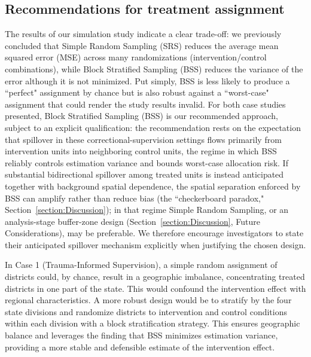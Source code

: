 \documentclass{article}[11pt]
\begin{document}
\subsection{Recommendations for treatment assignment}
The results of our simulation study indicate a clear trade-off: we previously concluded that Simple Random Sampling (SRS) reduces the average mean squared error (MSE) across many randomizations (intervention/control combinations), while Block Stratified Sampling (BSS) reduces the variance of the error although it is not minimized. Put simply, BSS is less likely to produce a ``perfect" assignment by chance but is also robust against a ``worst-case" assignment that could render the study results invalid. %
For both case studies presented, Block Stratified Sampling (BSS) is our recommended approach, subject to an explicit qualification: the recommendation rests on the expectation that spillover in these correctional-supervision settings flows primarily from intervention units into neighboring control units, the regime in which BSS reliably controls estimation variance and bounds worst-case allocation risk. If substantial bidirectional spillover among treated units is instead anticipated together with background spatial dependence, the spatial separation enforced by BSS can amplify rather than reduce bias (the ``checkerboard paradox," Section~\ref{section:Discussion}); in that regime Simple Random Sampling, or an analysis-stage buffer-zone design (Section~\ref{section:Discussion}, Future Considerations), may be preferable. We therefore encourage investigators to state their anticipated spillover mechanism explicitly when justifying the chosen design.

In Case 1 (Trauma-Informed Supervision), a simple random assignment of districts could, by chance, result in a geographic imbalance, concentrating treated districts in one part of the state. This would confound the intervention effect with regional characteristics. A more robust design would be to stratify by the four state divisions and randomize districts to intervention and control conditions within each division with a block stratification strategy. This ensures geographic balance and leverages the finding that BSS minimizes estimation variance, providing a more stable and defensible estimate of the intervention effect.
\end{document}
